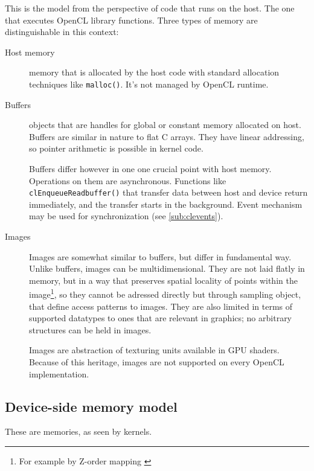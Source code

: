 This is the model from the perspective of code that runs on the host. The one
that executes OpenCL library functions. Three types of memory are distinguishable
in this context:

\begin{description}
  \item[Host memory]
    memory that is allocated by the host code with standard allocation techniques
    like \texttt{malloc()}. It's not managed by OpenCL runtime.
  \item[Buffers]
    objects that are handles for global or constant memory allocated on host.
    Buffers are similar in nature to flat C arrays. They have linear addressing,
    so pointer arithmetic is possible in kernel code.

    Buffers differ however in one one crucial point with host memory. Operations
    on them are asynchronous. Functions like \texttt{clEnqueueReadbuffer()} that
    transfer data between host and device return immediately, and the transfer
    starts in the background. Event mechanism may be used for synchronization
    (see \autoref{sub:clevents}).
  \item[Images]
    Images are somewhat similar to buffers, but differ in fundamental way.
    Unlike buffers, images can be multidimensional. They are not laid flatly in
    memory, but in a way that preserves spatial locality of points within the
    image\footnote{For example by Z-order mapping \parencite{gaster2012heterogeneous}},
    so they cannot be adressed directly but through sampling object, that define
    access patterns to images. They are also limited in terms of supported
    datatypes to ones that are relevant in graphics; no arbitrary structures can
    be held in images.

    Images are abstraction of texturing units available in GPU shaders. Because
    of this heritage, images are not supported on every OpenCL implementation.

\end{description}

\subsection{Device-side memory model}

These are memories, as seen by kernels.

